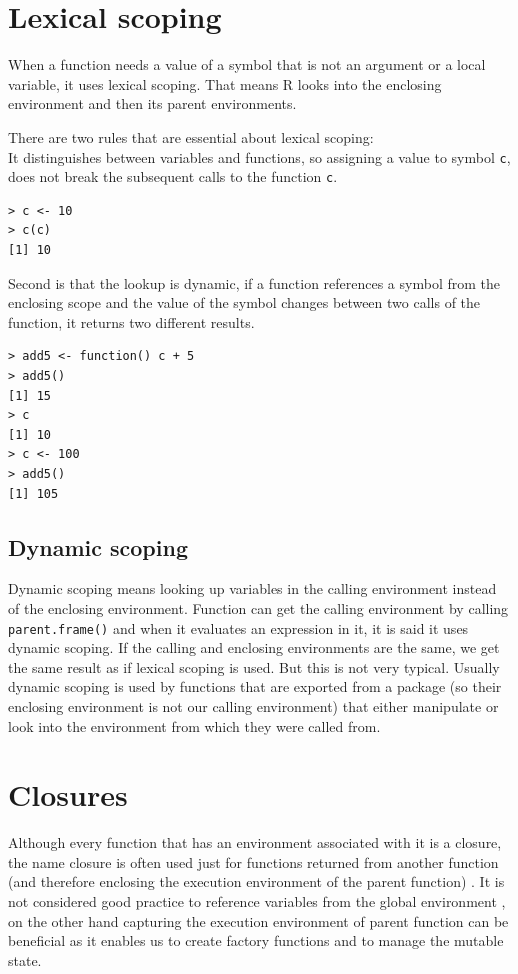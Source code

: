 \documentclass[thesis=B,english]{FITthesis}[2012/10/20]
\begin{document}
\section{Lexical scoping}
When a function needs a value of a symbol that is not an argument or a local variable, it uses lexical scoping. That means R looks into the enclosing environment and then its parent environments.

There are two rules that are essential about lexical scoping: \\
It distinguishes between variables and functions, so assigning a value to symbol \verb|c|, does not break the subsequent calls to the function \verb|c|.

\begin{verbatim}
> c <- 10
> c(c)
[1] 10
\end{verbatim}

Second is that the lookup is dynamic, if a function references a symbol from the enclosing scope and the value of the symbol changes between two calls of the function, it returns two different results.

\begin{verbatim}
> add5 <- function() c + 5
> add5()
[1] 15
> c
[1] 10
> c <- 100
> add5()
[1] 105
\end{verbatim}

\subsection{Dynamic scoping}
Dynamic scoping means looking up variables in the calling environment instead of the enclosing environment. Function can get the calling environment by calling \verb|parent.frame()| and when it evaluates an expression in it, it is said it uses dynamic scoping. If the calling and enclosing environments are the same, we get the same result as if lexical scoping is used. But this is not very typical. Usually dynamic scoping is used by functions that are exported from a package (so their enclosing environment is not our calling environment) that either manipulate or look into the environment from which they were called from.

\section{Closures}
Although every function that has an environment associated with it is a closure, the name closure is often used just for functions returned from another function (and therefore enclosing the execution environment of the parent function) \cite{advR}. It is not considered good practice to reference variables from the global environment \cite{advR}, on the other hand capturing the execution environment of parent function can be beneficial as it enables us to create factory functions and to manage the mutable state.
\end{document}
